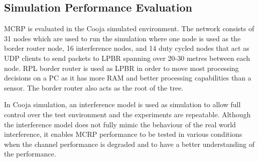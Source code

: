 \subsection{Simulation Performance Evaluation}




MCRP is evaluated in the Cooja simulated environment. 
The network consists of 31 nodes which are used to run the simulation where one node is used as the border router node, 16 interference nodes, and 14 duty cycled nodes that act as UDP clients to send packets to LPBR spanning over 20-30 metres between each node. RPL border router is used as LPBR in order to move most processing decisions on a PC as it has more RAM and better processing capabilities than a sensor.
The border router also acts as the root of the tree.

In Cooja simulation, an interference model is used as simulation to allow full control over the test environment and the experiments are repeatable. Although the interference model does not fully mimic the behaviour of the real world interference, it enables MCRP performance to be tested in various conditions when the channel performance is degraded and to have a better understanding of the performance.


